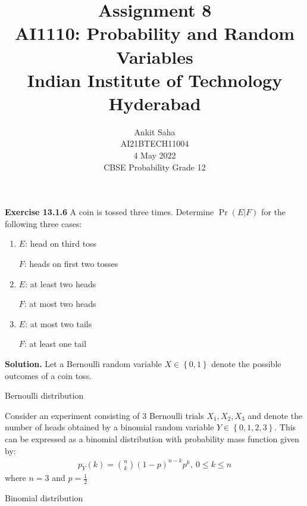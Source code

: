 \documentclass[journal,12pt,twocolumn]{IEEEtran}
\title{Assignment 8 \\ \Large AI1110: Probability and Random Variables \\ \large Indian Institute of Technology Hyderabad}
\author{Ankit Saha \\ \normalsize AI21BTECH11004 \\ \vspace*{20pt} \normalsize  4 May 2022 \\ \vspace*{20pt} \Large CBSE Probability Grade 12}
\providecommand{\pr}[1]{\ensuremath{\Pr\left(#1\right)}}
\providecommand{\cbrak}[1]{\ensuremath{\left\{#1\right\}}}
\begin{document}
	\maketitle
	
	\textbf{Exercise 13.1.6} 
	A coin is tossed three times. Determine $\pr{E|F}$ for the following three cases: 
	\begin{enumerate}[label=(\roman*)]
	\item
	$E$: head on third toss
	
	$F$: heads on first two tosses
	
	\item
	$E$: at least two heads
	
	$F$: at most two heads
	
	\item
	$E$: at most two tails
	
	$F$: at least one tail
	\end{enumerate}
	
	\textbf{Solution.}
	Let a Bernoulli random variable $X \in \cbrak{0,1}$ denote the possible outcomes of a coin toss.
	\begin{table}[ht!]
		\centering
		
		\caption{Bernoulli distribution}
		\label{table:table1}	
	\end{table}
	
	Consider an experiment consisting of $3$ Bernoulli trials $X_1, X_2, X_3$ and denote the number of heads obtained by a binomial random variable $Y \in \cbrak{0,1,2,3}$. This can be expressed as a binomial distribution with probability mass function given by:
	\begin{align}
		p_Y(k) = \binom{n}{k} (1-p)^{n-k} p^k,~ 0 \le k \le n
	\end{align}
	where $n = 3$ and $p = \frac12$
	\begin{table}[ht!]
		\centering
		
		\caption{Binomial distribution}
		\label{table:table2}	
	\end{table}
	
\end{document}
